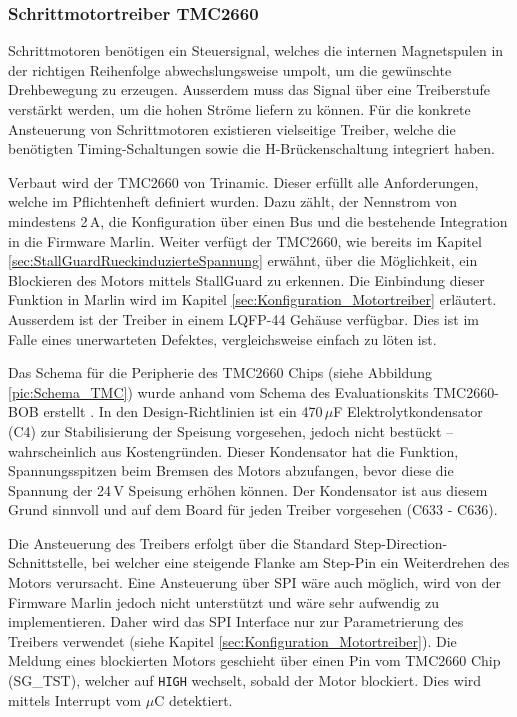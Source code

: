 \subsubsection{Schrittmotortreiber TMC2660}
\label{sec:SteppertreiberTMC2660}

Schrittmotoren benötigen ein Steuersignal, welches die internen Magnetspulen in der richtigen Reihenfolge abwechslungsweise umpolt, um die gewünschte Drehbewegung zu erzeugen. 
Ausserdem muss das Signal über eine Treiberstufe verstärkt werden, um die hohen Ströme liefern zu können.
Für die konkrete Ansteuerung von Schrittmotoren existieren vielseitige Treiber, welche die benötigten Timing-Schaltungen sowie die H-Brückenschaltung integriert haben.

Verbaut wird der TMC2660 von Trinamic. Dieser erfüllt alle Anforderungen, welche im Pflichtenheft definiert wurden.
Dazu zählt, der Nennstrom von mindestens 2\,A, die Konfiguration über einen Bus und die bestehende Integration in die Firmware Marlin.
Weiter verfügt der TMC2660, wie bereits im Kapitel \ref{sec:StallGuardRueckinduzierteSpannung} erwähnt, über die Möglichkeit, ein Blockieren des Motors mittels StallGuard zu erkennen. Die Einbindung dieser Funktion in Marlin wird im Kapitel \ref{sec:Konfiguration_Motortreiber} erläutert. Ausserdem ist der Treiber in einem LQFP-44 Gehäuse verfügbar. Dies ist im Falle eines unerwarteten Defektes, vergleichsweise einfach zu löten ist.

Das Schema für die Peripherie des TMC2660 Chips (siehe Abbildung \ref{pic:Schema_TMC}) wurde anhand vom Schema des Evaluationskits \mbox{TMC2660-BOB} erstellt \cite{TMC2660_Bob}. In den Design-Richtlinien ist ein 470\,$\mu$F Elektrolytkondensator (C4) zur Stabilisierung der Speisung vorgesehen, jedoch nicht bestückt -- wahrscheinlich aus Kostengründen. Dieser Kondensator hat die Funktion, Spannungsspitzen beim Bremsen des Motors abzufangen, bevor diese die Spannung der 24\,V Speisung erhöhen können. Der Kondensator ist aus diesem Grund sinnvoll und auf dem Board für jeden Treiber vorgesehen (C633 - C636).

Die Ansteuerung des Treibers erfolgt über die Standard Step-Direction-Schnittstelle, bei welcher eine steigende Flanke am Step-Pin ein Weiterdrehen des Motors verursacht. Eine Ansteuerung über SPI wäre auch möglich, wird von der Firmware Marlin jedoch nicht unterstützt und wäre sehr aufwendig zu implementieren. Daher wird das SPI Interface nur zur Parametrierung des Treibers verwendet (siehe Kapitel \ref{sec:Konfiguration_Motortreiber}). Die Meldung eines blockierten Motors geschieht über einen Pin vom TMC2660 Chip (SG\_{}TST), welcher auf \texttt{HIGH} wechselt, sobald der Motor blockiert. Dies wird mittels Interrupt vom $\mu$C detektiert.


